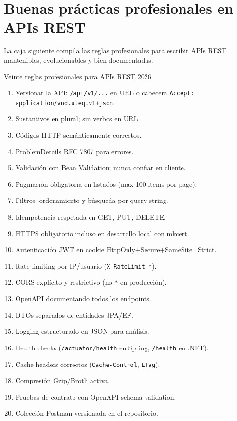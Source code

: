\section{Buenas prácticas profesionales en APIs REST}

La caja siguiente compila las reglas profesionales para
escribir APIs REST mantenibles, evolucionables y bien documentadas.


\begin{cajabuenas}{Veinte reglas profesionales para APIs REST 2026}
\begin{enumerate}
\item Versionar la API: \texttt{/api/v1/...} en URL o cabecera
\texttt{Accept: application/vnd.uteq.v1+json}.
\item Sustantivos en plural; sin verbos en URL.
\item Códigos HTTP semánticamente correctos.
\item ProblemDetails RFC 7807 para errores.
\item Validación con Bean Validation; nunca confiar en cliente.
\item Paginación obligatoria en listados (max 100 items por page).
\item Filtros, ordenamiento y búsqueda por query string.
\item Idempotencia respetada en GET, PUT, DELETE.
\item HTTPS obligatorio incluso en desarrollo local con mkcert.
\item Autenticación JWT en cookie HttpOnly+Secure+SameSite=Strict.
\item Rate limiting por IP/usuario (\texttt{X-RateLimit-*}).
\item CORS explícito y restrictivo (no \texttt{*} en producción).
\item OpenAPI documentando todos los endpoints.
\item DTOs separados de entidades JPA/EF.
\item Logging estructurado en JSON para análisis.
\item Health checks (\texttt{/actuator/health} en Spring,
\texttt{/health} en .NET).
\item Cache headers correctos (\texttt{Cache-Control}, \texttt{ETag}).
\item Compresión Gzip/Brotli activa.
\item Pruebas de contrato con OpenAPI schema validation.
\item Colección Postman versionada en el repositorio.
\end{enumerate}
\end{cajabuenas}

